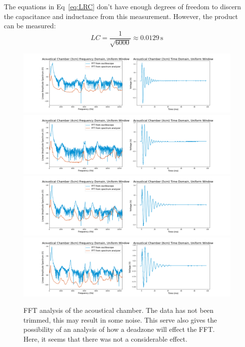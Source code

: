 \documentclass[12pt]{article}
\begin{document}
The equations in Eq~\ref{eq:LRC} don't have enough degrees of freedom to discern the capacitance and inductance from this measurement. However, the product can be measured:
\[LC = \frac{1}{\sqrt{6000}}\approx 0.0129 \, \text{s}\]
    
    
\begin{figure}[!ht]
    \centering
    \includegraphics[width=\textwidth]{Acoustical Chamber (3cm) (uniform)}
    \includegraphics[width=\textwidth]{Acoustical Chamber (4cm) (uniform)}
    \includegraphics[width=\textwidth]{Acoustical Chamber (5cm) (uniform)}
    \includegraphics[width=\textwidth]{Acoustical Chamber (6cm) (uniform)}
    \caption{FFT analysis of the acoustical chamber. The data has not been trimmed, this may result in some noise. This serve also gives the possibility of an analysis of how a deadzone will effect the FFT. Here, it seems that there was not a considerable effect.}
    \label{fig:AC_fft}
\end{figure} %
\end{document}
